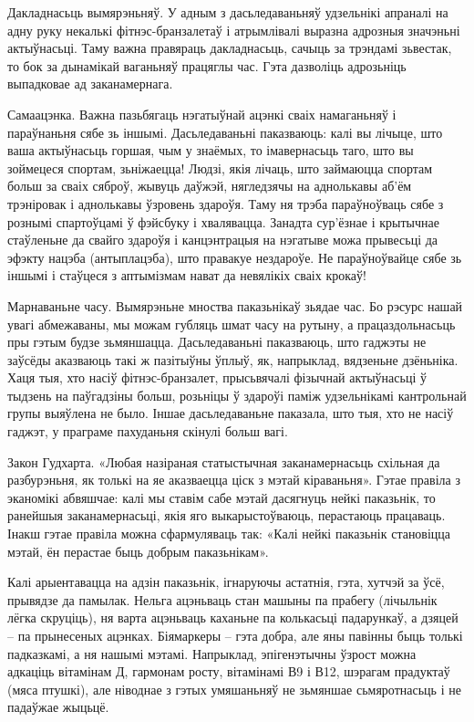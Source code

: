 Дакладнасьць вымярэньняў. У адным з дасьледаваньняў удзельнікі апраналі на адну руку некалькі фітнэс-бранзалетаў і атрымлівалі выразна адрозныя значэньні актыўнасьці. Таму важна правяраць дакладнасьць, сачыць за трэндамі зьвестак, то бок за дынамікай ваганьняў працяглы час. Гэта дазволіць адрозьніць выпадковае ад заканамернага.

Самаацэнка. Важна пазьбягаць нэгатыўнай ацэнкі сваіх намаганьняў і параўнаньня сябе зь іншымі. Дасьледаваньні паказваюць: калі вы лічыце, што ваша актыўнасьць горшая, чым у знаёмых, то імавернасьць таго, што вы зоймецеся спортам, зьніжаецца! Людзі, якія лічаць, што займаюцца спортам больш за сваіх сяброў, жывуць даўжэй, нягледзячы на аднолькавы аб'ём трэніровак і аднолькавы ўзровень здароўя. Таму ня трэба параўноўваць сябе з рознымі спартоўцамі ў фэйсбуку і хвалявацца. Занадта сур'ёзнае і крытычнае стаўленьне да свайго здароўя і канцэнтрацыя на нэгатыве можа прывесьці да эфэкту нацэба (антыплацэба), што правакуе нездароўе. Не параўноўвайце сябе зь іншымі і стаўцеся з аптымізмам нават да невялікіх сваіх крокаў!

Марнаваньне часу. Вымярэньне мноства паказьнікаў зьядае час. Бо рэсурс нашай увагі абмежаваны, мы можам губляць шмат часу на рутыну, а працаздольнасьць пры гэтым будзе зьмяншацца. Дасьледаваньні паказваюць, што гаджэты не заўсёды аказваюць такі ж пазітыўны ўплыў, як, напрыклад, вядзеньне дзёньніка. Хаця тыя, хто насіў фітнэс-бранзалет, прысьвячалі фізычнай актыўнасьці ў тыдзень на паўгадзіны больш, розьніцы ў здароўі паміж удзельнікамі кантрольнай групы выяўлена не было. Іншае дасьледаваньне паказала, што тыя, хто не насіў гаджэт, у праграме пахуданьня скінулі больш вагі.

Закон Гудхарта. «Любая назіраная статыстычная заканамернасьць схільная да разбурэньня, як толькі на яе аказваецца ціск з мэтай кіраваньня». Гэтае правіла з эканомікі абвяшчае: калі мы ставім сабе мэтай дасягнуць нейкі паказьнік, то ранейшыя заканамернасьці, якія яго выкарыстоўваюць, перастаюць працаваць. Інакш гэтае правіла можна сфармуляваць так: «Калі нейкі паказьнік становіцца мэтай, ён перастае быць добрым паказьнікам».

Калі арыентавацца на адзін паказьнік, ігнаруючы астатнія, гэта, хутчэй за ўсё, прывядзе да памылак. Нельга ацэньваць стан машыны па прабегу (лічыльнік лёгка скруціць), ня варта ацэньваць каханьне па колькасьці падарункаў, а дзяцей – па прынесеных ацэнках. Біямаркеры – гэта добра, але яны павінны быць толькі падказкамі, а ня нашымі мэтамі. Напрыклад, эпігенэтычны ўзрост можна адкаціць вітамінам Д, гармонам росту, вітамінамі В9 і В12, шэрагам прадуктаў (мяса птушкі), але ніводнае з гэтых умяшаньняў не зьмяншае сьмяротнасьць і не падаўжае жыцьцё.

